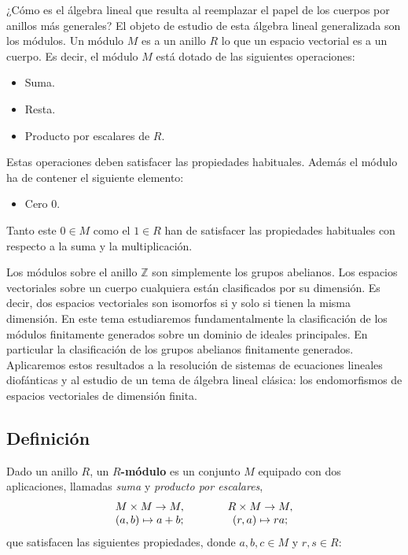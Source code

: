 
¿Cómo es el álgebra lineal que resulta al reemplazar el papel de los
cuerpos por anillos más generales? El objeto de estudio de esta álgebra
lineal generalizada son los módulos. Un módulo \(M\) es a un anillo
\(R\) lo que un espacio vectorial es a un cuerpo. Es decir, el módulo
\(M\) está dotado de las siguientes operaciones:

\begin{itemize}
\item
  Suma.
\item
  Resta.
\item
  Producto por escalares de \(R\).
\end{itemize}

Estas operaciones deben satisfacer las propiedades habituales. Además el
módulo ha de contener el siguiente elemento:

\begin{itemize}
\tightlist
\item
  Cero \(0\).
\end{itemize}

Tanto este \(0\in M\) como el \(1\in R\) han de satisfacer las
propiedades habituales con respecto a la suma y la multiplicación.

Los módulos sobre el anillo \(\mathbb Z\) son simplemente los grupos
abelianos. Los espacios vectoriales sobre un cuerpo cualquiera están
clasificados por su dimensión. Es decir, dos espacios vectoriales son
isomorfos si y solo si tienen la misma dimensión. En este tema
estudiaremos fundamentalmente la clasificación de los módulos
finitamente generados sobre un dominio de ideales principales. En
particular la clasificación de los grupos abelianos finitamente
generados. Aplicaremos estos resultados a la resolución de sistemas de
ecuaciones lineales diofánticas y al estudio de un tema de álgebra
lineal clásica: los endomorfismos de espacios vectoriales de dimensión
finita.

\hypertarget{definiciuxf3n}{%
\subsection{Definición}\label{definiciuxf3n}}


Dado un anillo \(R\), un \textbf{\(R\)-módulo} es un conjunto \(M\)
equipado con dos aplicaciones, llamadas \emph{suma} y \emph{producto por
escalares}, \[
\begin{array}{ccc}
M\times M\rightarrow M, &\qquad& R\times M\rightarrow M,\cr
(a,b)\mapsto a+b;&&(r,a) \mapsto ra;
\end{array}
\] que satisfacen las siguientes propiedades, donde \(a,b,c\in M\) y
\(r,s\in R\):

